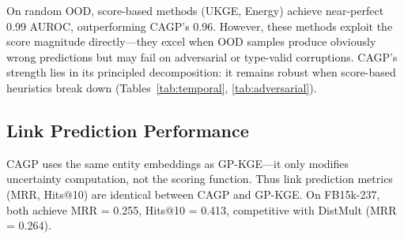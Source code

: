 On random OOD, score-based methods (UKGE, Energy) achieve near-perfect 0.99 AUROC, outperforming CAGP's 0.96.
However, these methods exploit the score magnitude directly---they excel when OOD samples produce obviously wrong predictions but may fail on adversarial or type-valid corruptions.
CAGP's strength lies in its principled decomposition: it remains robust when score-based heuristics break down (Tables~\ref{tab:temporal}, \ref{tab:adversarial}).

\subsection{Link Prediction Performance}

CAGP uses the same entity embeddings as GP-KGE---it only modifies uncertainty computation, not the scoring function.
Thus link prediction metrics (MRR, Hits@10) are identical between CAGP and GP-KGE.
On FB15k-237, both achieve MRR = 0.255, Hits@10 = 0.413, competitive with DistMult (MRR = 0.264).
